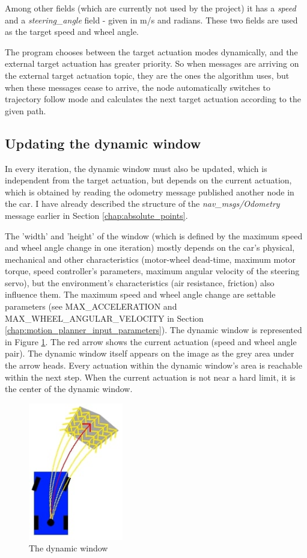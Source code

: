Among other fields (which are currently not used by the project) it has a \textit{speed} and a \textit{steering\_angle} field - given in m/s and radians. These two fields are used as the target speed and wheel angle.

The program chooses between the target actuation modes dynamically, and the external target actuation has greater priority. So when messages are arriving on the external target actuation topic, they are the ones the algorithm uses, but when these messages cease to arrive, the node automatically switches to trajectory follow mode and calculates the next target actuation according to the given path.

\subsection{Updating the dynamic window}
In every iteration, the dynamic window must also be updated, which is independent from the target actuation, but depends on the current actuation, which is obtained by reading the odometry message published another node in the car. I have already described the structure of the \textit{nav\_msgs/Odometry} \cite{ros_msg_Odometry} message earlier in Section \ref{chap:absolute_points}.

The 'width' and 'height' of the window (which is defined by the maximum speed and wheel angle change in one iteration) mostly depends on the car's physical, mechanical and other characteristics (motor-wheel dead-time, maximum motor torque, speed controller's parameters, maximum angular velocity of the steering servo), but the environment's characteristics (air resistance, friction) also influence them. The maximum speed and wheel angle change are settable parameters (see MAX\_ACCELERATION and MAX\_WHEEL\_ANGULAR\_VELOCITY in Section \ref{chap:motion_planner_input_parameters}). The dynamic window is represented in Figure \ref{dynamic_window}. The red arrow shows the current actuation (speed and wheel angle pair). The dynamic window itself appears on the image as the grey area under the arrow heads. Every actuation within the dynamic window's area is reachable within the next step. When the current actuation is not near a hard limit, it is the center of the dynamic window.

\begin{figure}[!ht]
    \centering
    \includegraphics[height=60mm]{figures/raw/jpeg/dynamic_window.jpg}
    \caption{The dynamic window}
    \label{dynamic_window}
\end{figure}

